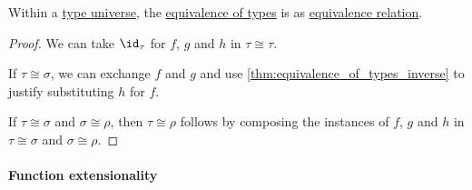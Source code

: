\begin{proposition}\label{thm:equivalence_of_types_is_equivalence}
  Within a \hyperref[con:type_universe]{type universe}, the \hyperref[def:equivalence_of_types]{equivalence of types} is as \hyperref[def:equivalence_relation]{equivalence relation}.
\end{proposition}
\begin{proof}
   We can take \( \id_\tau \) for \( f \), \( g \) and \( h \) in \( \tau \cong \tau \).

   If \( \tau \cong \sigma \), we can exchange \( f \) and \( g \) and use \cref{thm:equivalence_of_types_inverse} to justify substituting \( h \) for \( f \).

   If \( \tau \cong \sigma \) and \( \sigma \cong \rho \), then \( \tau \cong \rho \) follows by composing the instances of \( f \), \( g \) and \( h \) in \( \tau \cong \sigma \) and \( \sigma \cong \rho \).
\end{proof}

\paragraph{Function extensionality}

